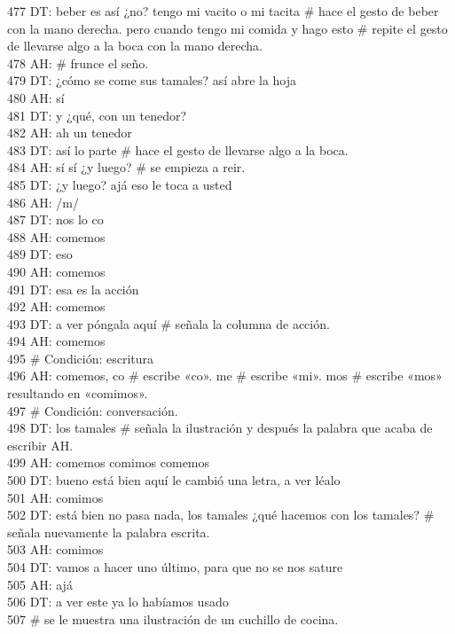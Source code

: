 477 DT: beber es así ¿no? tengo mi vacito o mi tacita \# hace el gesto de beber con la mano derecha. pero cuando tengo mi comida y hago esto \# repite el gesto de llevarse algo a la boca con la mano derecha.\\
478 AH: \# frunce el seño.\\
479 DT: ¿cómo se come sus tamales? así abre la hoja\\
480 AH: sí\\
481 DT: y ¿qué, con un tenedor?\\
482 AH: ah un tenedor\\
483 DT: así lo parte \# hace el gesto de llevarse algo a la boca.\\
484 AH: sí sí ¿y luego? \# se empieza a reir.\\
485 DT: ¿y luego? ajá eso le toca a usted\\
486 AH: /m/\\
487 DT: nos lo co\\
488 AH: comemos\\
489 DT: eso\\
490 AH: comemos\\
491 DT: esa es la acción\\
492 AH: comemos\\
493 DT: a ver póngala aquí \# señala la columna de acción.\\
494 AH: comemos\\
495 \# Condición: escritura\\
496 AH: comemos, co \# escribe «co». me \# escribe «mi». mos \# escribe «mos» resultando en «comimos».\\
497 \# Condición: conversación.\\
498 DT: los tamales \# señala la ilustración y después la palabra que acaba de escribir AH.\\
499 AH: comemos comimos comemos\\
500 DT: bueno está bien aquí le cambió una letra, a ver léalo\\
501 AH: comimos\\
502 DT: está bien no pasa nada, los tamales ¿qué hacemos con los tamales? \# señala nuevamente la palabra escrita.\\
503 AH: comimos\\
504 DT: vamos a hacer uno último, para que no se nos sature\\
505 AH: ajá\\
506 DT: a ver este ya lo habíamos usado\\
507 \# se le muestra una ilustración de un cuchillo de cocina.\\
